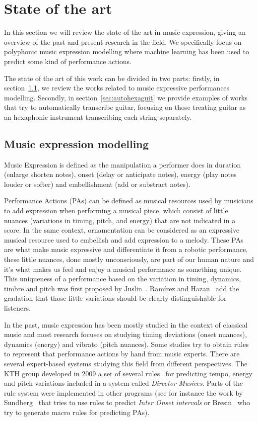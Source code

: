\normallinespacing
\chapter{State of the art}
\label{chap:sota}
In this section we will review the state of the art in music expression, giving an
overview of the past and present research in the field. We specifically focus on polyphonic music expression modelling where machine learning has been used to predict some kind of performance actions.

The state of the art of this work can be divided in two parts: firstly, in section~\ref{sec:muexpmod}, we review the works related to music expressive performances modelling. Secondly, in section~\ref{sec:autohexaguit} we provide examples of works that try to automatically transcribe guitar, focusing on those treating guitar as an hexaphonic instrument transcribing each string separately. 

\section{Music expression modelling}
\label{sec:muexpmod}
Music Expression is defined as the manipulation a performer does in duration (enlarge shorten notes), onset (delay or
anticipate notes), energy (play notes louder or softer) and embellishment (add or substract notes).

Performance Actions (PAs) can be defined as musical resources used by musicians to add expression when performing a musical piece, which consist of little nuances (variations in timing, pitch, and energy) that are not indicated in a score. In the same context, ornamentation can be considered as an expressive musical resource used to embellish and add expression to a melody. These PAs are what make music expressive and differentiate it from a robotic performance, these little nuances, done mostly unconsciously, are part of our human nature and it's what makes us feel and enjoy a musical performance as something unique. This uniqueness of a performance based on the variation in timing, dynamics, timbre and pitch was first proposed by Juslin~\cite{Juslin2001}. Ramírez and Hazan~\cite{Ramirez2006} add the gradation that those little variations should be clearly distinguishable for listeners.

In the past, music expression has been mostly studied in the context of classical music and most research focuses on studying timing deviations (onset nuances), dynamics (energy) and vibrato (pitch nuances). Some studies try to obtain rules to represent that performance actions by hand from music experts. There are several expert-based systems studying this field from different perspectives. The KTH group developed in 2009 a set of several rules~\cite{Friberg2009} for predicting tempo, energy and pitch variations included in a system called \textit{Director Musices}. Parts of the rule system were implemented in other programs (see for instance the work by Sundberg~\cite{Sundberg2003} that tries to use rules to predict \textit{Inter Onset intervals} or Bresin~\cite{Bresin2000} who try to generate macro rules for predicting PAs).

